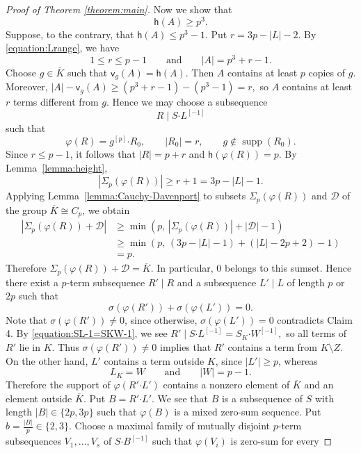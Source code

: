 \documentclass[a4paper, 12pt]{article}
\theoremstyle{definition}
\DeclareMathOperator{\supp}{supp}
\begin{document}
\begin{proof}[Proof of Theorem \ref{theorem:main}]
Now we show that
\begin{equation}\label{equation:h(A)geqp3}
\mathsf h(A)\geq p^3.
\end{equation}
Suppose, to the contrary, that $\mathsf h(A)\leq p^3-1$. Put
$r=3p-|L|-2.$
By \eqref{equation:Lrange}, we have
$$
1\leq r\leq p-1
\qquad\text{and}\qquad
|A|=p^3+r-1.
$$
Choose $g\in\overline K$ such that
$\mathsf v_g(A)=\mathsf h(A)$. Then $A$ contains at least $p$
copies of $g$. Moreover,
$|A|-\mathsf v_g(A)
\geq
(p^3+r-1)-(p^3-1)
=r,$
so $A$ contains at least $r$ terms different from $g$. Hence we may
choose a subsequence
$$R\mid S\boldsymbol{\cdot}L^{[-1]}$$ such that
$$\varphi(R)
=
g^{[p]}\boldsymbol{\cdot}R_0,
\qquad
|R_0|=r,
\qquad
g\notin\supp(R_0).$$
Since $r\leq p-1$, it follows that
$|R|=p+r$ and
$\mathsf h(\varphi(R))=p.$
By Lemma~\ref{lemma:height},
$$|\Sigma_p(\varphi(R))|
\geq r+1
=3p-|L|-1.$$
Applying Lemma~\ref{lemma:Cauchy-Davenport} to subsets
$\Sigma_p(\varphi(R))$ and $\mathcal D$ of the group $\overline K\cong C_p$, we obtain
$$\begin{aligned}
\left|
\Sigma_p(\varphi(R))+\mathcal D
\right|
&\geq
\min\left(
p,\,
|\Sigma_p(\varphi(R))|+|\mathcal D|-1
\right)\\
&\geq
\min\left(
p,\,
(3p-|L|-1)+(|L|-2p+2)-1
\right)\\
&=p.
\end{aligned}$$
Therefore
$\Sigma_p(\varphi(R))+\mathcal D=\overline K.$
In particular, $0$ belongs to this sumset. Hence there exist a
$p$-term subsequence $R'\mid R$ and a subsequence $L'\mid L$ of
length $p$ or $2p$ such that
$$\sigma(\varphi(R'))+\sigma(\varphi(L'))=0.$$
Note that $\sigma(\varphi(R'))\ne0$, since otherwise, $\sigma(\varphi(L'))=0$ contradicts Claim 4. By \eqref{equation:SL-1=SKW-1}, we see
$R'\mid
S\boldsymbol{\cdot}L^{[-1]}
=
S_K\boldsymbol{\cdot}W^{[-1]},$
so all terms of $R'$ lie in $K$. Thus
$\sigma(\varphi(R'))\ne0$ implies that $R'$ contains a term from
$K\setminus Z$.
On the other hand,
$L'$ contains a term outside $K$, since
$|L'|\geq p$, whereas
$$
L_K=W
\qquad\text{and}\qquad
|W|=p-1.
$$
Therefore the support of
$\varphi(R'\boldsymbol{\cdot}L')$ contains a nonzero element of
$\overline K$ and an element outside $\overline K$. Put
$B=R'\boldsymbol{\cdot}L'.$ We see that $B$ is a subsequence of $S$ with length
$|B|\in\{2p,3p\}$
such that $\varphi(B)$ is a mixed zero-sum sequence.
Put
$b=\frac{|B|}{p}\in\{2,3\}.$
Choose a maximal family of
mutually disjoint $p$-term subsequences
$V_1,\ldots,V_s$ of $S\boldsymbol{\cdot}B^{[-1]}$ such that $\varphi(V_i)$ is zero-sum for every

\end{proof}
\end{document}
